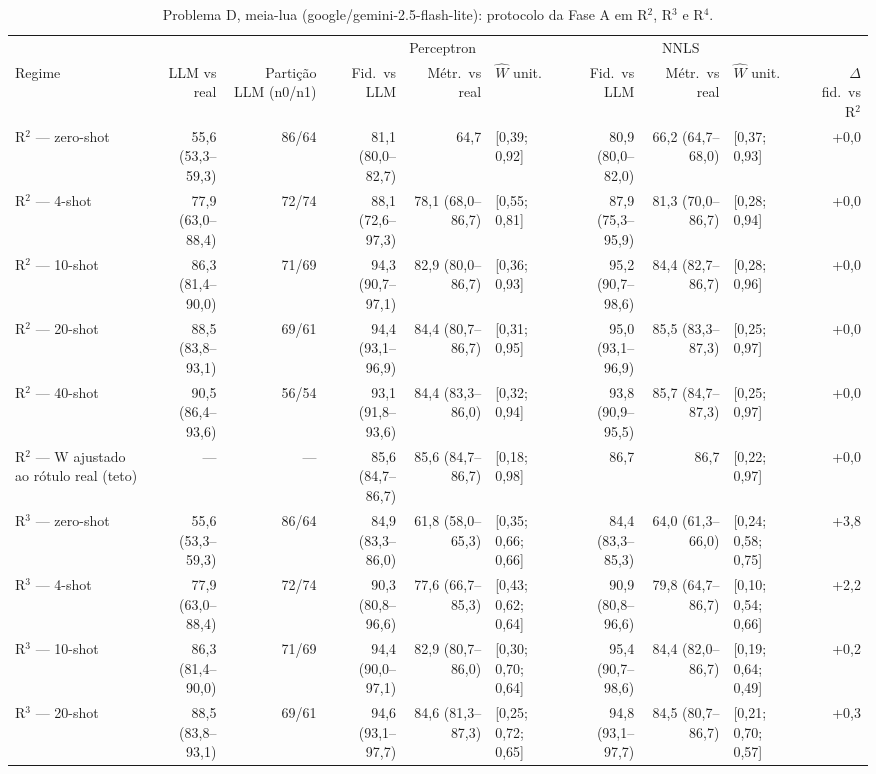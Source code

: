 \begin{table}[htbp]
\centering
\footnotesize
\caption{Problema D, meia-lua (google/gemini-2.5-flash-lite): protocolo da Fase A em R$^2$, R$^3$ e R$^4$.}
\label{tab:T3_D_flashlite}
\begin{tabular}{lrrrrlrrlr}
\toprule
 &  &  & \multicolumn{3}{c}{Perceptron} & \multicolumn{3}{c}{NNLS} &  \\ \cmidrule(lr){4-6} \cmidrule(lr){7-9}
Regime & LLM vs real & Partição LLM (n0/n1) & Fid.\ vs LLM & Métr.\ vs real & $\hat{W}$ unit. & Fid.\ vs LLM & Métr.\ vs real & $\hat{W}$ unit. & $\Delta$ fid.\ vs R$^2$ \\
\midrule
R$^2$ — zero-shot & 55,6 (53,3–59,3) & 86/64 & 81,1 (80,0–82,7) & 64,7 & [0,39; 0,92] & 80,9 (80,0–82,0) & 66,2 (64,7–68,0) & [0,37; 0,93] & +0,0 \\
R$^2$ — 4-shot & 77,9 (63,0–88,4) & 72/74 & 88,1 (72,6–97,3) & 78,1 (68,0–86,7) & [0,55; 0,81] & 87,9 (75,3–95,9) & 81,3 (70,0–86,7) & [0,28; 0,94] & +0,0 \\
R$^2$ — 10-shot & 86,3 (81,4–90,0) & 71/69 & 94,3 (90,7–97,1) & 82,9 (80,0–86,7) & [0,36; 0,93] & 95,2 (90,7–98,6) & 84,4 (82,7–86,7) & [0,28; 0,96] & +0,0 \\
R$^2$ — 20-shot & 88,5 (83,8–93,1) & 69/61 & 94,4 (93,1–96,9) & 84,4 (80,7–86,7) & [0,31; 0,95] & 95,0 (93,1–96,9) & 85,5 (83,3–87,3) & [0,25; 0,97] & +0,0 \\
R$^2$ — 40-shot & 90,5 (86,4–93,6) & 56/54 & 93,1 (91,8–93,6) & 84,4 (83,3–86,0) & [0,32; 0,94] & 93,8 (90,9–95,5) & 85,7 (84,7–87,3) & [0,25; 0,97] & +0,0 \\
R$^2$ — W ajustado ao rótulo real (teto) & — & — & 85,6 (84,7–86,7) & 85,6 (84,7–86,7) & [0,18; 0,98] & 86,7 & 86,7 & [0,22; 0,97] & +0,0 \\
\midrule
R$^3$ — zero-shot & 55,6 (53,3–59,3) & 86/64 & 84,9 (83,3–86,0) & 61,8 (58,0–65,3) & [0,35; 0,66; 0,66] & 84,4 (83,3–85,3) & 64,0 (61,3–66,0) & [0,24; 0,58; 0,75] & +3,8 \\
R$^3$ — 4-shot & 77,9 (63,0–88,4) & 72/74 & 90,3 (80,8–96,6) & 77,6 (66,7–85,3) & [0,43; 0,62; 0,64] & 90,9 (80,8–96,6) & 79,8 (64,7–86,7) & [0,10; 0,54; 0,66] & +2,2 \\
R$^3$ — 10-shot & 86,3 (81,4–90,0) & 71/69 & 94,4 (90,0–97,1) & 82,9 (80,7–86,0) & [0,30; 0,70; 0,64] & 95,4 (90,7–98,6) & 84,4 (82,0–86,7) & [0,19; 0,64; 0,49] & +0,2 \\
R$^3$ — 20-shot & 88,5 (83,8–93,1) & 69/61 & 94,6 (93,1–97,7) & 84,6 (81,3–87,3) & [0,25; 0,72; 0,65] & 94,8 (93,1–97,7) & 84,5 (80,7–86,7) & [0,21; 0,70; 0,57] & +0,3 \\

\end{tabular}
\end{table}
